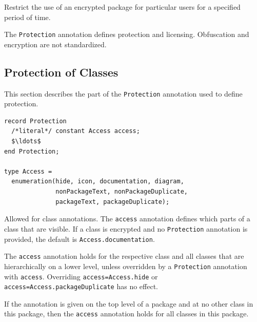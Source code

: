 \begin{definition}[Licensing]
Restrict the use of an encrypted package for particular users for a specified period of time.
\end{definition}

The \lstinline!Protection! annotation defines protection and licensing.
Obfuscation and encryption are not standardized.


\subsection{Protection of Classes}\label{protection-of-classes}

This section describes the part of the \lstinline!Protection! annotation used to define protection.

\begin{annotationdefinition*}[access]\label{modelica:Protection.access}
\begin{synopsis}\begin{lstlisting}
record Protection
  /*literal*/ constant Access access;
  $\ldots$
end Protection;

type Access =
  enumeration(hide, icon, documentation, diagram,
              nonPackageText, nonPackageDuplicate,
              packageText, packageDuplicate);
\end{lstlisting}\end{synopsis}
\begin{semantics}
Allowed for class annotations.
The \lstinline!access! annotation defines which parts of a class that are visible.
If a class is encrypted and no \lstinline!Protection! annotation is provided, the default is \lstinline!Access.documentation!.

The \lstinline!access! annotation holds for the respective class and all classes that are hierarchically on a lower level, unless overridden by a \lstinline!Protection! annotation with \lstinline!access!.
Overriding \lstinline!access=Access.hide! or \lstinline!access=Access.packageDuplicate! has no effect.

\begin{example}
If the annotation is given on the top level of a package and at no other class in this package, then the \lstinline!access! annotation holds for all classes in this package.
\end{example}


\end{semantics}
\end{annotationdefinition*}
